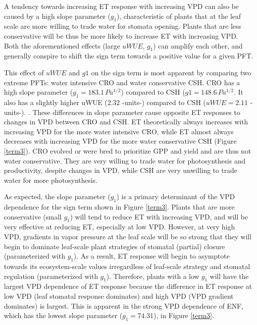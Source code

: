 \documentclass[draft,linenumbers]{agujournal}
\begin{document}
A tendency towards increasing ET response with increasing VPD can also be caused by a high slope parameter ($g_1$), characteristic of plants that at the leaf scale are more willing to trade water for stomata opening. Plants that are less conservative will be thus be more likely to increase ET with increasing VPD. Both the aforementioned effects (large $uWUE$, $g_1$) can amplify each other, and generally conspire to shift the sign term towards a positive value for a given PFT.

This effect of $uWUE$ and $g1$ on the sign term is most apparent by comparing two extreme PFTs: water intensive CRO and water conservative CSH. CRO has a high slope parameter ($g_1 = 183.1 \, Pa^{1/2}$) compared to CSH ($g1 = 148.6 \, Pa^{1/2}$. It also has a slightly higher uWUE ($2.32$ -units-) compared to CSH ($uWUE=2.11$ -units-). . These differences in slope parameter cause opposite ET responses to changes in VPD between CRO and CSH. ET theoretically always increases with increasing VPD for the more water intensive CRO, while ET almost always decreases with increasing VPD for the more water conservative CSH (Figure \ref{term3}). CRO evolved or were bred to prioritize GPP and yield and are thus not water conservative. They are very willing to trade water for photosynthesis and productivity, despite changes in VPD, while CSH are very unwilling to trade water for more photosynthesis.

As expected, the slope parameter ($g_1$) is a primary determinant of the VPD dependence for the sign term shown in Figure \ref{term3}. Plants that are more conservative (small $g_1$) will tend to reduce ET with increasing VPD, and will be very effective at reducing ET, especially at low VPD. However, at very high VPD, gradients in vapor pressure at the leaf scale will be so strong that they will begin to dominate leaf-scale plant strategies of stomatal (partial) closure (parameterized with $g_1$). As a result, ET response will begin to asymptote towards its ecosystem-scale values irregardless of leaf-scale strategy and stomatal regulation (parameterized with $g_1$). Therefore, plants with a low $g_1$ will have the largest VPD dependence of ET response because the difference in ET response at low VPD (leaf stomatal response dominates) and high VPD (VPD gradient dominates) is largest. This is apparent in the strong VPD dependence of ENF, which has the lowest slope parameter ($g_1=74.31$), in Figure \ref{term3}.  
\end{document}
